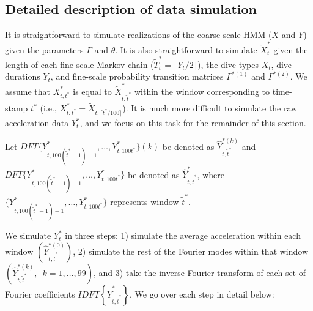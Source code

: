 
\subsection{Detailed description of data simulation}

It is straightforward to simulate realizations of the coarse-scale HMM ($X$ and $Y$) given the parameters $\Gamma$ and $\theta$. It is also straightforward to simulate $\tilde X^*_t$ given the length of each fine-scale Markov chain ($\tilde T^*_t = \lfloor Y_t/2 \rfloor$), the dive types $X_t$, dive durations $Y_t$, and fine-scale probability transition matrices $\Gamma^{*(1)}$ and $\Gamma^{*(2)}$. 
We assume that $X^*_{t,t^*}$ is equal to $\tilde X^*_{t,\tilde t^*}$ within the window corresponding to time-stamp $t^*$ (i.e., $X^*_{t,t^*} = \tilde X_{t,\lceil t^*/100 \rceil}$). It is much more difficult to simulate the raw acceleration data $Y^*_t$, and we focus on this task for the remainder of this section. 

Let $DFT\{Y^*_{t,100(\tilde t^*-1) + 1},\ldots,Y^*_{t,100t^*}\}(k)$ be denoted as $\hat{Y}^{*(k)}_{t,\tilde t^*}$ and $DFT\{Y^*_{t,100(\tilde t^*-1) + 1},\ldots,Y^*_{t,100t^*}\}$ be denoted as $\hat{Y}^{*}_{t,\tilde t^*}$, where $\{Y^*_{t,100(\tilde t^*-1) + 1},\ldots,Y^*_{t,100t^*}\}$ represents window $\tilde t^*$. 

We simulate $Y_t^*$ in three steps: 1) simulate the average acceleration within each window $\left(\hat{Y}^{*(0)}_{t,\tilde t^*}\right)$, 2) simulate the rest of the Fourier modes within that window $\left(\hat{Y}^{*(k)}_{t,\tilde t^*}, \enspace k = 1,\ldots,99\right)$, and 3) take the inverse Fourier transform of each set of Fourier coefficients $IDFT\left
\{\hat{Y}^{*}_{t,\tilde t^*}\right\}$. We go over each step in detail below:

